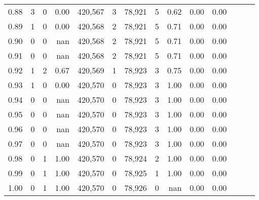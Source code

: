\begin{tabular}{rrrrrrrrrrrrrr}
0.88 &       3 &      0 &  0.00 &  420,567 &        3 &  78,921 &       5 &  0.62 &  0.00 &      0.00 \\
0.89 &       1 &      0 &  0.00 &  420,568 &        2 &  78,921 &       5 &  0.71 &  0.00 &      0.00 \\
0.90 &       0 &      0 &   nan &  420,568 &        2 &  78,921 &       5 &  0.71 &  0.00 &      0.00 \\
0.91 &       0 &      0 &   nan &  420,568 &        2 &  78,921 &       5 &  0.71 &  0.00 &      0.00 \\
0.92 &       1 &      2 &  0.67 &  420,569 &        1 &  78,923 &       3 &  0.75 &  0.00 &      0.00 \\
0.93 &       1 &      0 &  0.00 &  420,570 &        0 &  78,923 &       3 &  1.00 &  0.00 &      0.00 \\
0.94 &       0 &      0 &   nan &  420,570 &        0 &  78,923 &       3 &  1.00 &  0.00 &      0.00 \\
0.95 &       0 &      0 &   nan &  420,570 &        0 &  78,923 &       3 &  1.00 &  0.00 &      0.00 \\
0.96 &       0 &      0 &   nan &  420,570 &        0 &  78,923 &       3 &  1.00 &  0.00 &      0.00 \\
0.97 &       0 &      0 &   nan &  420,570 &        0 &  78,923 &       3 &  1.00 &  0.00 &      0.00 \\
0.98 &       0 &      1 &  1.00 &  420,570 &        0 &  78,924 &       2 &  1.00 &  0.00 &      0.00 \\
0.99 &       0 &      1 &  1.00 &  420,570 &        0 &  78,925 &       1 &  1.00 &  0.00 &      0.00 \\
1.00 &       0 &      1 &  1.00 &  420,570 &        0 &  78,926 &       0 &   nan &  0.00 &      0.00 \\
\bottomrule
\end{tabular}
